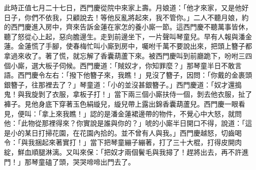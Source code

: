 此時正值七月二十七日，西門慶從院中來家上壽。月娘道：「他才來家，又是他好日子，你們不依我，只顧說去！等他反亂將起來，我不管你。」二人不聽月娘，約的西門慶進入房中，齊來告訴金蓮在家怎的養小廝一節。這西門慶不聽萬事皆休，聽了怒從心上起，惡向膽邊生。走到前邊坐下，一片聲叫琴童兒。早有人報與潘金蓮。金蓮慌了手腳，使春梅忙叫小廝到房中，囑咐千萬不要說出來，把頭上簪子都拿過來收了。著了慌，就忘解了香囊葫蘆下來。被西門慶叫到前廳跪下，吩咐三四個小廝，選大板子伺候。西門慶道：「賊奴才，你知罪麼？」那琴童半日不敢言語。西門慶令左右：「撥下他簪子來，我瞧！」見沒了簪子，因問：「你戴的金裹頭銀簪子，往那裡去了？」琴童道：「小的並沒甚銀簪子。」西門慶道：「奴才還搗鬼！與我旋剝了衣服，拿板子打！」當下兩三個小廝扶侍一個，剝去他衣服，扯了褲子。見他身底下穿著玉色絹縼兒，縼兒帶上露出錦香囊葫蘆兒。西門慶一眼看見，便叫：「拿上來我瞧！」認的是潘金蓮裙邊帶的物件，不覺心中大怒，就問他：「此物從那裡得來？你實說是誰與你的？」唬的小廝半日開口不得，說道：「這是小的某日打掃花園，在花園內拾的。並不曾有人與我。」西門慶越怒，切齒喝令：「與我捆起來著實打！」當下把琴童繃子繃著，打了三十大棍，打得皮開肉綻，鮮血順腿淋漓。又叫來保：「把奴才兩個鬢毛與我撏了！趕將出去，再不許進門！」那琴童磕了頭，哭哭啼啼出門去了。

